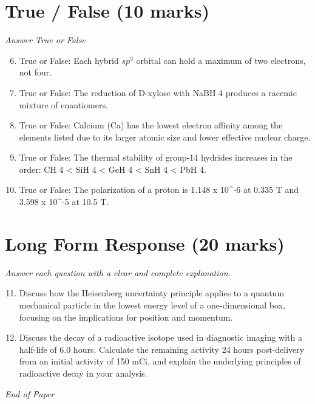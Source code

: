\documentclass[12pt]{article}
\begin{document}
\section*{True / False (10 marks)}
\textit{Answer True or False}
\begin{enumerate}[label=\arabic*.]
\setcounter{enumi}{5}
\item True or False: Each hybrid $sp^3$ orbital can hold a maximum of two electrons, not four.
\item True or False: The reduction of D-xylose with NaBH 4 produces a racemic mixture of enantiomers.
\item True or False: Calcium (Ca) has the lowest electron affinity among the elements listed due to its larger atomic size and lower effective nuclear charge.
\item True or False: The thermal stability of group-14 hydrides increases in the order: CH 4 \textless{} SiH 4 \textless{} GeH 4 \textless{} SnH 4 \textless{} PbH 4.
\item True or False: The polarization of a proton is 1.148 x 10^-6 at 0.335 T and 3.598 x 10^-5 at 10.5 T.
\end{enumerate}

\section*{Long Form Response (20 marks)}
\textit{Answer each question with a clear and complete explanation.}
\begin{enumerate}[label=\arabic*.]
\setcounter{enumi}{10}
\item Discuss how the Heisenberg uncertainty principle applies to a quantum mechanical particle in the lowest energy level of a one-dimensional box, focusing on the implications for position and momentum.
\item Discuss the decay of a radioactive isotope used in diagnostic imaging with a half-life of 6.0 hours. Calculate the remaining activity 24 hours post-delivery from an initial activity of 150 mCi, and explain the underlying principles of radioactive decay in your analysis.
\end{enumerate}

\vfill
\noindent\textit{End of Paper}
\end{document}
